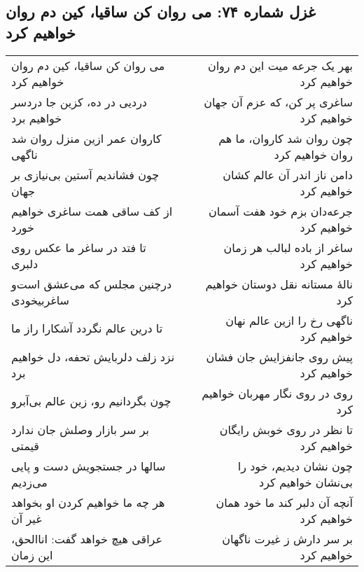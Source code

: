 \begin{center}
\section*{غزل شماره ۷۴: می روان کن ساقیا، کین دم روان خواهیم کرد}
\label{sec:074}
\begin{longtable}{l p{0.5cm} r}
می روان کن ساقیا، کین دم روان خواهیم کرد
&&
بهر یک جرعه میت این دم روان خواهیم کرد
\\
دردیی در ده، کزین جا دردسر خواهیم برد
&&
ساغری پر کن، که عزم آن جهان خواهیم کرد
\\
کاروان عمر ازین منزل روان شد ناگهی
&&
چون روان شد کاروان، ما هم روان خواهیم کرد
\\
چون فشاندیم آستین بی‌نیازی بر جهان
&&
دامن ناز اندر آن عالم کشان خواهیم کرد
\\
از کف ساقی همت ساغری خواهیم خورد
&&
جرعه‌دان بزم خود هفت آسمان خواهیم کرد
\\
تا فتد در ساغر ما عکس روی دلبری
&&
ساغر از باده لبالب هر زمان خواهیم کرد
\\
درچنین مجلس که می‌عشق است‌و ساغربیخودی
&&
نالهٔ مستانه نقل دوستان خواهیم کرد
\\
تا درین عالم نگردد آشکارا راز ما
&&
ناگهی رخ را ازین عالم نهان خواهیم کرد
\\
نزد زلف دلربایش تحفه، دل خواهیم برد
&&
پیش روی جانفزایش جان فشان خواهیم کرد
\\
چون بگردانیم رو، زین عالم بی‌آبرو
&&
روی در روی نگار مهربان خواهیم کرد
\\
بر سر بازار وصلش جان ندارد قیمتی
&&
تا نظر در روی خوبش رایگان خواهیم کرد
\\
سالها در جستجویش دست و پایی می‌زدیم
&&
چون نشان دیدیم، خود را بی‌نشان خواهیم کرد
\\
هر چه ما خواهیم کردن او بخواهد غیر آن
&&
آنچه آن دلبر کند ما خود همان خواهیم کرد
\\
عراقی هیچ خواهد گفت: اناالحق، این زمان
&&
بر سر دارش ز غیرت ناگهان خواهیم کرد
\\
\end{longtable}
\end{center}
